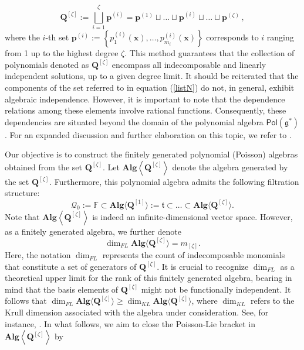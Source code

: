 \documentclass[10pt]{amsart}
\theoremstyle{definition}
\theoremstyle{corollary}
\theoremstyle{remark}
\theoremstyle{conclusion}
\begin{document}
\begin{equation}
	\boldsymbol{Q}^{[\zeta]}:=\bigsqcup_{i=1}^\zeta \boldsymbol{p}^{(i)} = \boldsymbol{p}^{(1)} \sqcup \dots  \sqcup \boldsymbol{p}^{(i)}  \sqcup \dots \sqcup \boldsymbol{p}^{(\zeta)}   \, ,
	\label{listN}
\end{equation}
where the  $i$-th set $\boldsymbol{p}^{(i)}:=\left\{p_1^{(i)}(\boldsymbol{x}), \dots,p_{m_i}^{(i)}(\boldsymbol{x})\right\}$ corresponds to $i$ ranging from 1  up to the highest degree $\zeta$. This method guarantees that the collection of polynomials denoted as $\boldsymbol{Q}^{[\zeta]}$  encompass all indecomposable and linearly independent solutions, up to a given degree limit. It should be reiterated that the components of the set referred to in equation (\ref{listN}) do not, in general, exhibit algebraic independence. However, it is important to note that the  dependence relations among these elements involve rational functions. Consequently, these dependencies are situated beyond the domain of the polynomial algebra $\mathsf{Pol}(\mathfrak{g^*})$. For an expanded discussion and further elaboration on this topic, we refer to \cite{campoamor2023algebraic}.

\medskip
Our objective is to construct the finitely generated polynomial (Poisson) algebras obtained from the set $\boldsymbol{Q}^{[\zeta]}$. Let $\textbf{Alg} \left\langle \boldsymbol{Q}^{[\zeta]} \right\rangle $ denote the algebra generated by the set $\boldsymbol{Q}^{[\zeta]}.$ Furthermore, this polynomial algebra  admits  the following filtration structure: \begin{equation*}
\mathcal{Q}_0 := \mathbb{F} \subset \textbf{Alg}\langle \boldsymbol{Q}^{[1]} \rangle:= \mathfrak{t} \subset \dots \subset \textbf{Alg}\langle \boldsymbol{Q}^{[\zeta]} \rangle .
\end{equation*} Note that $\textbf{Alg} \left\langle \boldsymbol{Q}^{[\zeta]} \right \rangle$ is indeed an infinite-dimensional vector space. However, as a finitely generated algebra, we further denote \begin{equation*}
    \dim_{FL}\textbf{Alg}\langle \boldsymbol{Q}^{[\zeta]} \rangle=  m_{[\zeta]}.
\end{equation*} Here, the notation $\dim_{FL}$ represents the count of indecomposable monomials that constitute  a set of generators of $\boldsymbol{Q}^{[\zeta]} $. It is crucial to recognize $\dim_{FL}$ as a theoretical upper limit for the rank of this finitely generated algebra, bearing in mind that the basis elements of $\boldsymbol{Q}^{[\zeta]} $ might not be  functionally independent. It follows that $\dim_{FL} \textbf{Alg}\langle \boldsymbol{Q}^{[\zeta]} \rangle \geq \dim_{KL} \textbf{Alg}\langle \boldsymbol{Q}^{[\zeta]} \rangle$, where $\dim_{KL}$ refers to the Krull dimension associated with the algebra under consideration. See, for instance, \cite{MR1322960}. In what follows, we aim to close the Poisson-Lie bracket in $\textbf{Alg} \left\langle \boldsymbol{Q}^{[\zeta]} \right\rangle $ by 
\end{document}
